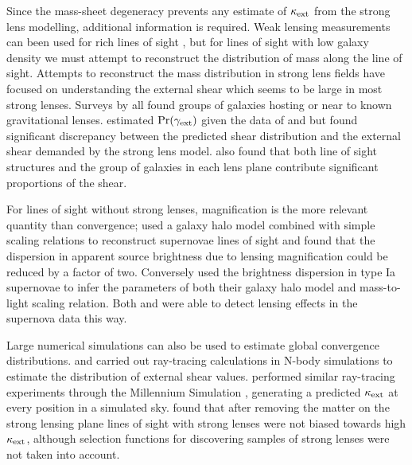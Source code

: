 \documentclass[useAMS,usenatbib,a4paper]{mn2e}
\begin{document}
Since the mass-sheet degeneracy prevents any estimate of $\kappa_{\rm ext}$ from the 
strong lens modelling, additional information is required. Weak lensing measurements
can been used for rich lines of sight \citep{NakajimaEtal2009, FadelyEtal2009}, but 
for lines of sight with low galaxy density we must attempt to reconstruct the distribution
of mass along the line of sight. Attempts to reconstruct the mass distribution in strong
lens fields have focused on understanding the external shear which seems to be large in most strong lenses.
Surveys by \citet{Fassnacht+Lubin2002,AugerEtal2007,WilliamsEtal2006,MomchevaEtal2006}
all found groups of galaxies hosting or near to known gravitational lenses.
\citet{WongEtal2011} estimated $\Pr(\gamma_{\rm ext})$ given the data of \citet{WilliamsEtal2006}
and \citet{MomchevaEtal2006} but found significant discrepancy between the predicted shear
distribution and the external shear demanded by the strong lens model. 
\citeauthor{WongEtal2011} also found that both line of
sight structures and the group of galaxies in each lens plane contribute
significant proportions of the shear. 

For lines of sight without strong lenses, magnification is the more relevant
quantity than convergence; \citet{GunnarssonEtal2006} used a galaxy halo model
combined with simple scaling relations to reconstruct supernovae lines of
sight and found that the dispersion in apparent source brightness due to
lensing magnification could be reduced by a factor of two. Conversely
\citet{KarpenkaEtal2012} used the brightness dispersion in type Ia supernovae
to infer the parameters of both their galaxy halo model and mass-to-light
scaling relation. Both \citeauthor{KarpenkaEtal2012} and
\citet{JonssonEtal2010} were able to  detect lensing effects in the supernova
data this way.

Large numerical simulations can also be used to estimate global convergence
distributions. \citet{Holder+Schechter2003} and \citet{DalalEtal2005} carried
out ray-tracing calculations in N-body simulations to estimate the
distribution of external shear values.  \citet{HilbertEtal2009} performed
similar ray-tracing experiments through the Millennium Simulation
\citep{SpringelEtal2005}, generating a predicted $\kappa_{\rm ext}$ at every position
in a simulated sky. \citet{HilbertEtal2009} found that after removing the
matter on the strong lensing plane \MS lines of sight with strong lenses were
not biased towards high $\kappa_{\rm ext}$, although selection functions for
discovering samples of strong lenses were not taken into account.
\end{document}

